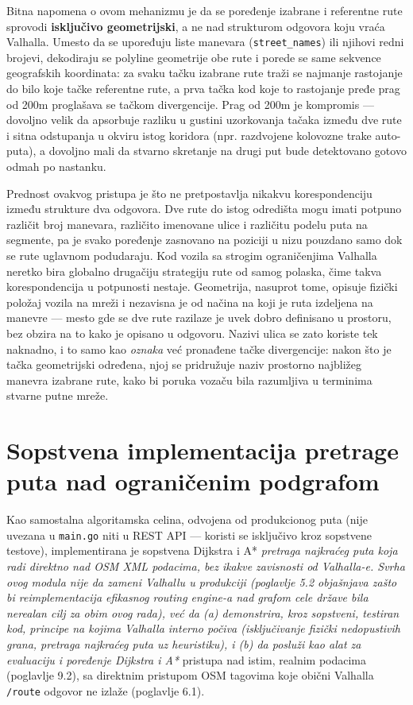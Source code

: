 Bitna napomena o ovom mehanizmu je da se poređenje izabrane i referentne rute sprovodi \textbf{isključivo geometrijski}, a ne nad strukturom odgovora koju vraća Valhalla. Umesto da se upoređuju liste manevara (\texttt{street\_names}) ili njihovi redni brojevi, dekodiraju se polyline geometrije obe rute i porede se same sekvence geografskih koordinata: za svaku tačku izabrane rute traži se najmanje rastojanje do bilo koje tačke referentne rute, a prva tačka kod koje to rastojanje pređe prag od 200m proglašava se tačkom divergencije. Prag od 200m je kompromis — dovoljno velik da apsorbuje razliku u gustini uzorkovanja tačaka između dve rute i sitna odstupanja u okviru istog koridora (npr. razdvojene kolovozne trake auto-puta), a dovoljno mali da stvarno skretanje na drugi put bude detektovano gotovo odmah po nastanku.

Prednost ovakvog pristupa je što ne pretpostavlja nikakvu korespondenciju između strukture dva odgovora. Dve rute do istog odredišta mogu imati potpuno različit broj manevara, različito imenovane ulice i različitu podelu puta na segmente, pa je svako poređenje zasnovano na poziciji u nizu pouzdano samo dok se rute uglavnom podudaraju. Kod vozila sa strogim ograničenjima Valhalla neretko bira globalno drugačiju strategiju rute od samog polaska, čime takva korespondencija u potpunosti nestaje. Geometrija, nasuprot tome, opisuje fizički položaj vozila na mreži i nezavisna je od načina na koji je ruta izdeljena na manevre — mesto gde se dve rute razilaze je uvek dobro definisano u prostoru, bez obzira na to kako je opisano u odgovoru. Nazivi ulica se zato koriste tek naknadno, i to samo kao \emph{oznaka} već pronađene tačke divergencije: nakon što je tačka geometrijski određena, njoj se pridružuje naziv prostorno najbližeg manevra izabrane rute, kako bi poruka vozaču bila razumljiva u terminima stvarne putne mreže.

\section{Sopstvena implementacija pretrage puta nad ograničenim podgrafom}

Kao samostalna algoritamska celina, odvojena od produkcionog puta (nije uvezana u \texttt{main.go} niti u REST API — koristi se isključivo kroz sopstvene testove), implementirana je sopstvena Dijkstra i A*\emph{ pretraga najkraćeg puta koja radi direktno nad OSM XML podacima, bez ikakve zavisnosti od Valhalla-e. Svrha ovog modula nije da zameni Valhallu u produkciji (poglavlje 5.2 objašnjava zašto bi reimplementacija efikasnog routing engine-a nad grafom cele države bila nerealan cilj za obim ovog rada), već da (a) demonstrira, kroz sopstveni, testiran kod, principe na kojima Valhalla interno počiva (isključivanje fizički nedopustivih grana, pretraga najkraćeg puta uz heuristiku), i (b) da posluži kao alat za evaluaciju i poređenje Dijkstra i A*} pristupa nad istim, realnim podacima (poglavlje 9.2), sa direktnim pristupom OSM tagovima koje obični Valhalla \texttt{/route} odgovor ne izlaže (poglavlje 6.1).

